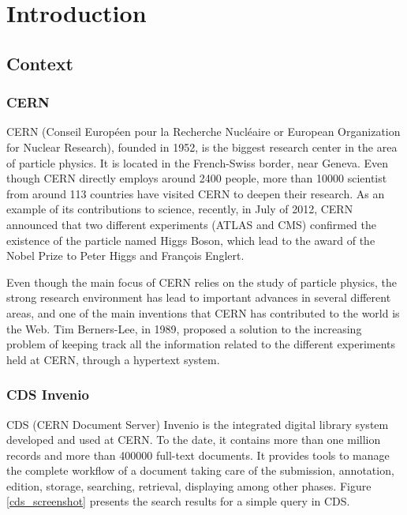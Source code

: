 \chapter{Introduction}


\section{Context}

\subsection{CERN}
CERN (Conseil Europ\'{e}en pour la Recherche Nucl\'{e}aire or European Organization for Nuclear Research)\cite{CERN}, founded in 1952, is the biggest research center in the area of particle physics. It is located in the French-Swiss border, near Geneva. Even though CERN directly employs around 2400 people, more than 10000 scientist from around 113 countries have visited CERN to deepen their research. As an example of its contributions to science, recently, in July of 2012, CERN announced that two different experiments (ATLAS and CMS) confirmed the existence of the particle named Higgs Boson, which lead to the award of the Nobel Prize to Peter Higgs and Fran\c{c}ois Englert.

Even though the main focus of CERN relies on the study of particle physics, the strong research environment has lead to important advances in several different areas, and one of the main inventions that CERN has contributed to the world is the Web. Tim Berners-Lee, in 1989, proposed a solution\cite{web_proposal} to the increasing problem of keeping track all the information related to the different experiments held at CERN, through a hypertext system. 

\subsection{CDS Invenio}
CDS\cite{CDS1} (CERN Document Server) Invenio is the integrated digital library system developed and used at CERN\cite{CDS2}. To the date, it contains more than one million records and more than 400000 full-text documents. It provides tools to manage the complete workflow of a document taking care of the submission, annotation, edition, storage, searching, retrieval, displaying among other phases. Figure \ref{cds_screenshot} presents the search results for a simple query in CDS.

